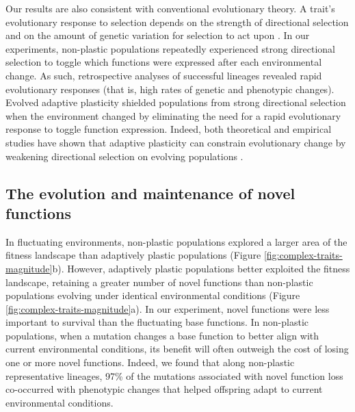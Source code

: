 \documentclass[utf8]{frontiersSCNS} %
\begin{document}
\begin{raggedbottom}
Our results are also consistent with conventional evolutionary theory.
A trait's evolutionary response to selection depends on the strength of directional selection and on the amount of genetic variation for selection to act upon \citep{lande_measurement_1983,zimmer_evolution_2013}.
In our experiments, non-plastic populations repeatedly experienced strong directional selection to toggle which functions were expressed after each environmental change.
As such, retrospective analyses of successful lineages revealed rapid evolutionary responses (that is, high rates of genetic and phenotypic changes).
Evolved adaptive plasticity shielded populations from strong directional selection when the environment changed by eliminating the need for a rapid evolutionary response to toggle function expression.
Indeed, both theoretical and empirical studies have shown that adaptive plasticity can constrain evolutionary change by weakening directional selection on evolving populations \citep{price_role_2003,paenke_influence_2007,ghalambor_non-adaptive_2015}.


\subsection{The evolution and maintenance of novel functions}

In fluctuating environments, non-plastic populations explored a larger area of the fitness landscape than adaptively plastic populations (Figure \ref{fig:complex-traits-magnitude}b).
However, adaptively plastic populations better exploited the fitness landscape, retaining a greater number of novel functions than non-plastic populations evolving under identical environmental conditions (Figure \ref{fig:complex-traits-magnitude}a).
In our experiment, novel functions were less important to survival than the fluctuating base functions.
In non-plastic populations, when a mutation changes a base function to better align with current environmental conditions, its benefit will often outweigh the cost of losing one or more novel functions.
Indeed, we found that along non-plastic representative lineages, 97\% of the mutations associated with novel function loss co-occurred with phenotypic changes that helped offspring adapt to current environmental conditions.


\end{raggedbottom}
\end{document}
